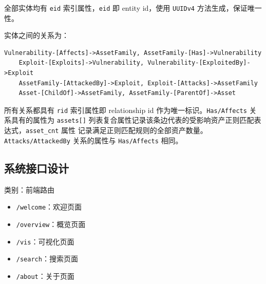 \documentclass[a4paper,AutoFakeBold,oneside,12pt]{book}
\begin{document}
全部实体均有 \lstinline|eid| 索引属性，\lstinline|eid| 即 entity id，使用 \lstinline|UUIDv4| 方法生成，保证唯一性。

实体之间的关系为：

\begin{lstlisting}[label={lst:neo4j_rels},breaklines,style=lgeneral]
	Vulnerability-[Affects]->AssetFamily, AssetFamily-[Has]->Vulnerability
	Exploit-[Exploits]->Vulnerability, Vulnerability-[ExploitedBy]->Exploit
	AssetFamily-[AttackedBy]->Exploit, Exploit-[Attacks]->AssetFamily
	Asset-[ChildOf]->AssetFamily, AssetFamily-[ParentOf]->Asset
\end{lstlisting}

所有关系都具有 \lstinline|rid| 索引属性即 relationship id 作为唯一标识。\lstinline|Has/Affects| 关系具有的属性为 \lstinline|assets[]| 列表复合属性记录该条边代表的受影响资产正则匹配表达式，\lstinline|asset_cnt| 属性
记录满足正则匹配规则的全部资产数量。\lstinline|Attacks/AttackedBy| 关系的属性与 \lstinline|Has/Affects| 相同。

\subsection{系统接口设计}

类别：前端路由
\begin{itemize}
	\item \lstinline|/welcome|：欢迎页面
	\item \lstinline|/overview|：概览页面
	\item \lstinline|/vis|：可视化页面
	\item \lstinline|/search|：搜索页面
	\item \lstinline|/about|：关于页面
\end{itemize}
\end{document}
